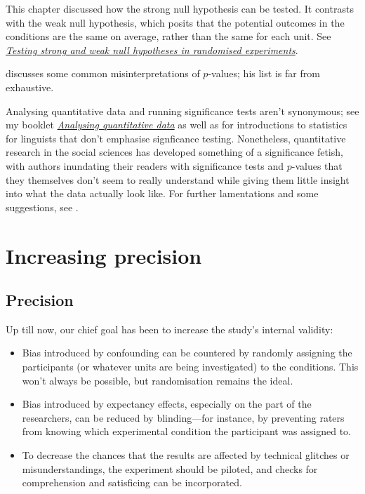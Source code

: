 \documentclass[a4paper]{tufte-book}\usepackage[]{graphicx}\usepackage[]{xcolor}
\begin{document}
This chapter discussed how the strong null hypothesis can
be tested.
It contrasts with the weak null hypothesis, which posits that
the potential outcomes in the conditions are the same on average, rather
than the same for each unit.
See
\href{https://janhove.github.io/posts/2026-07-13-weak-strong-H0/}{\textit{Testing strong and weak null hypotheses in randomised experiments}}.

\citet{Goodman2008} discusses some common misinterpretations of $p$-values;
his list is far from exhaustive.

Analysing quantitative data and running significance tests aren't
synonymous; see my booklet 
\href{https://janhove.github.io/resources.html#analysing-quantitative-data-an-introduction-for-language-researchers}{\textit{Analysing quantitative data}}
as well as \citet{Winter2019} for introductions
to statistics for linguists that don't emphasise signficance testing.
Nonetheless, quantitative research in the social sciences
has developed something of a significance fetish,
with authors inundating their readers with significance tests and $p$-values
that they themselves don't seem to really understand while giving them
little insight into what the data actually look like.
For further lamentations and some
suggestions, see \citet{Vanhove2020b}.


\chapter{Increasing precision}\label{ch:precision}

\section{Precision}
Up till now, our chief goal has been to increase the study's
internal validity:
\begin{itemize}
  \item Bias introduced by confounding can be countered by randomly
  assigning the participants (or whatever units are being investigated) to
  the conditions. This won't always be possible, but randomisation
  remains the ideal.
  
  \item Bias introduced by expectancy effects, especially on the part
  of the researchers, can be reduced by blinding---for instance,
  by preventing raters from knowing which experimental condition
  the participant was assigned to.
  
  \item To decrease the chances that the results are affected by
  technical glitches or misunderstandings, 
  the experiment should be piloted,
  and checks for comprehension and satisficing can be incorporated.
\end{itemize}
\end{document}
